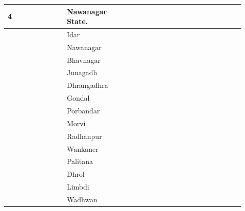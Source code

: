 \begin{longtable}{|p{0.23\linewidth}|p{0.23\linewidth}|p{0.23\linewidth}|p{0.23\linewidth}|}
{4





















} & \multirow{17}{*}{











Nawanagar State.





















} \\
\hline
 & Idar

 \\
\hline
 & Nawanagar

 \\
\hline
 & Bhavnagar

 \\
\hline
 & Junagadh

 \\
\hline
 & Dhrangadhra

 \\
\hline
 & Gondal

 \\
\hline
 & Porbandar

 \\
\hline
 & Morvi

 \\
\hline
 & Radhanpur

 \\
\hline
 & Wankaner

 \\
\hline
 & Palitana

 \\
\hline
 & Dhrol

 \\
\hline
 & Limbdi

 \\
\hline
 & Wadhwan


\end{longtable}
